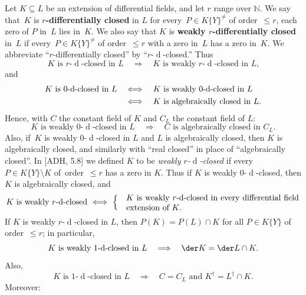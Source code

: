 \documentclass[]{amsart}
\numberwithin{equation}{section}
\newcommand{\bbold}{\mathbb}
\def\N { {\bbold N} }
\def \d{\operatorname{d}}
\theoremstyle{definition}
\theoremstyle{remark}
\renewcommand\leq{\leqslant}
\begin{document}
\noindent
Let $K\subseteq L$ be an extension of differential fields, and let $r$ range over $\N$. We say that~$K$ is {\bf $r$-differentially closed} in $L$ 
for every~$P\in K\{Y\}^{\neq}$ of order~$\leq r$, each zero of $P$ in~$L$   lies in~$K$. 
We also say that $K$ is {\bf weakly $r$-differentially closed} in~$L$ if 
 every~$P\in K\{Y\}^{\ne}$ of order~$\leq r$ with a zero in~$L$ has a zero in~$K$.
 We abbreviate ``$r$-differentially closed'' by ``$r$-$\d$-closed.''
 Thus 
$$\text{$K$ is $r$-$\d$-closed in $L$}\quad\Longrightarrow\quad\text{$K$ is  weakly $r$-$\d$-closed in~$L$,}$$ 
and
\begin{align}\label{eq:0-d-closed}
\text{$K$ is $0$-$\d$-closed in $L$}&\quad\Longleftrightarrow\quad 
  \text{$K$ is weakly $0$-$\d$-closed in $L$} \\ &\quad\Longleftrightarrow\quad
  \text{$K$ is algebraically closed in $L$.} \notag
\end{align} 
Hence, with $C$ the constant field of $K$ and $C_L$ the constant field of $L$:
\begin{equation}\label{eq:weakly 0-d-closed}
\text{$K$ is weakly $0$-$\d$-closed in $L$}\quad\Longrightarrow\quad\text{$C$ is algebraically closed in $C_L$.}
\end{equation}
Also, if~$K$ is weakly $0$-$\d$-closed in $L$
and $L$ is algebraically closed, then $K$ is algebraically closed, and similarly
with ``real closed'' in place of ``algebraically closed''. In [ADH, 5.8] we defined
$K$ to be {\it  weakly $r$-$\d$-closed}\/ if every $P\in K\{Y\}\setminus K$ of~order~$\leq r$ has a zero in $K$.
Thus if $K$ is weakly $0$-$\d$-closed, then $K$ is algebraically closed, and
$$\text{$K$ is weakly $r$-$\d$-closed}
\ \Longleftrightarrow\  \begin{cases} &\parbox{21em}{$K$ is weakly $r$-$\d$-closed in every differential field extension of $K$.}\end{cases}$$
If
$K$ is weakly   $r$-$\d$-closed in $L$, then $P(K)=P(L)\cap K$ for all $P\in K\{Y\}$ of or\-der~$\leq r$;
in particular, 
\begin{equation}\label{eq:weakly 1-d-closed}
\text{$K$ is weakly $1$-$\d$-closed in $L$}\quad\Longrightarrow\quad \der K=\der L\cap K.
\end{equation}
Also, 
\begin{equation}\label{eq:1-d-closed}
\text{$K$ is $1$-$\d$-closed in $L$}\quad\Longrightarrow\quad C=C_L\text{ and } K^\dagger=L^\dagger\cap K.
\end{equation}
Moreover:
\end{document}
